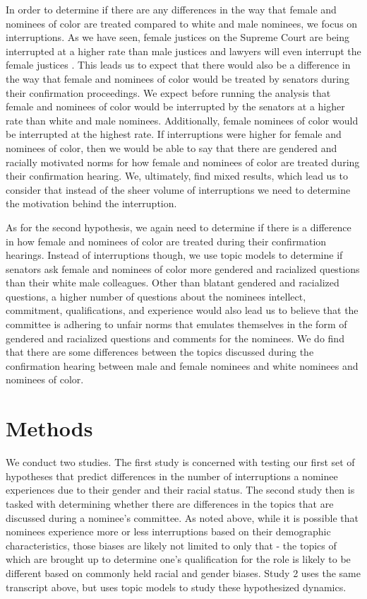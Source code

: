 \documentclass [12pt]{article}
\begin{document}
In order to determine if there are any differences in the way that female and nominees of color are treated compared to white and male nominees, we focus on interruptions. As we have seen, female justices on the Supreme Court are being interrupted at a higher rate than male justices and lawyers will even interrupt the female justices \citep{jacobi_2017}. This leads us to expect that there would also be a difference in the way that female and nominees of color would be treated by senators during their confirmation proceedings. We expect before running the analysis that female and nominees of color would be interrupted by the senators at a higher rate than white and male nominees. Additionally, female nominees of color would be interrupted at the highest rate. If interruptions were higher for female and nominees of color, then we would be able to say that there are gendered and racially motivated norms for how female and nominees of color are treated during their confirmation hearing. We, ultimately, find mixed results, which lead us to consider that instead of the sheer volume of interruptions we need to determine the motivation behind the interruption.

As for the second hypothesis, we again need to determine if there is a difference in how female and nominees of color are treated during their confirmation hearings. Instead of interruptions though, we use topic models to determine if senators ask female and nominees of color more gendered and racialized questions than their white male colleagues. Other than blatant gendered and racialized questions, a higher number of questions about the nominees intellect, commitment, qualifications, and experience would also lead us to believe that the committee is adhering to unfair norms that emulates themselves in the form of gendered and racialized questions and comments for the nominees. We do find that there are some differences between the topics discussed during the confirmation hearing between male and female nominees and white nominees and nominees of color.

\section{Methods}

We conduct two studies. The first study is concerned with testing our first set of hypotheses that predict differences in the number of interruptions a nominee experiences due to their gender and their racial status. The second study then is tasked with determining whether there are differences in the topics that are discussed during a nominee's committee. As noted above, while it is possible that nominees experience more or less interruptions based on their demographic characteristics, those biases are likely not limited to only that - the topics of which are brought up to determine one's qualification for the role is likely to be different based on commonly held racial and gender biases. Study 2 uses the same transcript above, but uses topic models to study these hypothesized dynamics.
	     
\end{document}
